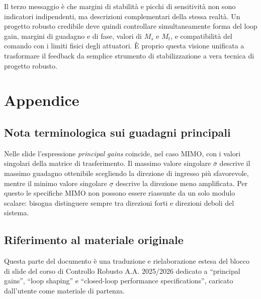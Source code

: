 \documentclass[11pt,a4paper]{article}
\begin{document}
Il terzo messaggio è che margini di stabilità e picchi di sensitività non sono indicatori indipendenti, ma descrizioni complementari della stessa realtà. Un progetto robusto credibile deve quindi controllare simultaneamente forma del loop gain, margini di guadagno e di fase, valori di $M_s$ e $M_t$, e compatibilità del comando con i limiti fisici degli attuatori. È proprio questa visione unificata a trasformare il feedback da semplice strumento di stabilizzazione a vera tecnica di progetto robusto.

\clearpage
{}
\section*{Appendice}

\subsection*{Nota terminologica sui guadagni principali}
{}

Nelle slide l'espressione \emph{principal gains} coincide, nel caso MIMO, con i valori singolari della matrice di trasferimento. Il massimo valore singolare $\bar{\sigma}$ descrive il massimo guadagno ottenibile scegliendo la direzione di ingresso più sfavorevole, mentre il minimo valore singolare $\underline{\sigma}$ descrive la direzione meno amplificata. Per questo le specifiche MIMO non possono essere riassunte da un solo modulo scalare: bisogna distinguere sempre tra direzioni forti e direzioni deboli del sistema.

\subsection*{Riferimento al materiale originale}
{}

Questa parte del documento è una traduzione e rielaborazione estesa del blocco di slide del corso di Controllo Robusto A.A. 2025/2026 dedicato a ``principal gains'', ``loop shaping'' e ``closed-loop performance specifications'', caricato dall'utente come materiale di partenza.
\end{document}
